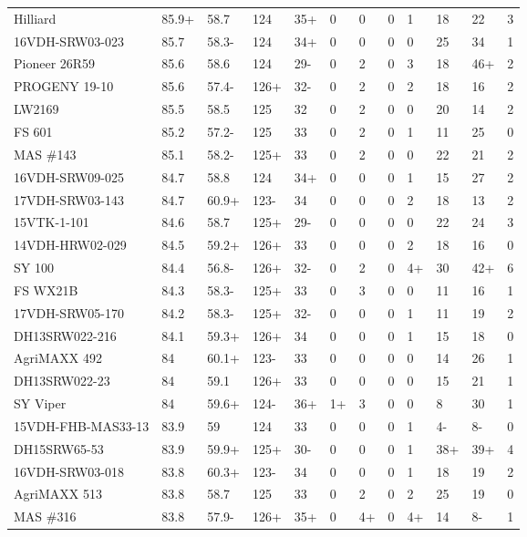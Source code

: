\documentclass[12pt, letterpaper]{article}
\begin{document}
\begin{landscape}
\begin{ThreePartTable}
\begin{longtable}{llllllllllll}
  Hilliard & 85.9+ & 58.7 & 124 & 35+ & 0 & 0 & 0 & 1 & 18 & 22 & 3 \\ 
  16VDH-SRW03-023 & 85.7 & 58.3- & 124 & 34+ & 0 & 0 & 0 & 0 & 25 & 34 & 1 \\ 
  Pioneer 26R59 & 85.6 & 58.6 & 124 & 29- & 0 & 2 & 0 & 3 & 18 & 46+ & 2 \\ 
  PROGENY 19-10 & 85.6 & 57.4- & 126+ & 32- & 0 & 2 & 0 & 2 & 18 & 16 & 2 \\ 
  LW2169 & 85.5 & 58.5 & 125 & 32 & 0 & 2 & 0 & 0 & 20 & 14 & 2 \\ 
  FS 601 & 85.2 & 57.2- & 125 & 33 & 0 & 2 & 0 & 1 & 11 & 25 & 0 \\ 
  MAS \#143 & 85.1 & 58.2- & 125+ & 33 & 0 & 2 & 0 & 0 & 22 & 21 & 2 \\ 
  16VDH-SRW09-025 & 84.7 & 58.8 & 124 & 34+ & 0 & 0 & 0 & 1 & 15 & 27 & 2 \\ 
  17VDH-SRW03-143 & 84.7 & 60.9+ & 123- & 34 & 0 & 0 & 0 & 2 & 18 & 13 & 2 \\ 
  15VTK-1-101 & 84.6 & 58.7 & 125+ & 29- & 0 & 0 & 0 & 0 & 22 & 24 & 3 \\ 
  14VDH-HRW02-029 & 84.5 & 59.2+ & 126+ & 33 & 0 & 0 & 0 & 2 & 18 & 16 & 0 \\ 
  SY 100 & 84.4 & 56.8- & 126+ & 32- & 0 & 2 & 0 & 4+ & 30 & 42+ & 6 \\ 
  FS WX21B & 84.3 & 58.3- & 125+ & 33 & 0 & 3 & 0 & 0 & 11 & 16 & 1 \\ 
  17VDH-SRW05-170 & 84.2 & 58.3- & 125+ & 32- & 0 & 0 & 0 & 1 & 11 & 19 & 2 \\ 
  DH13SRW022-216 & 84.1 & 59.3+ & 126+ & 34 & 0 & 0 & 0 & 1 & 15 & 18 & 0 \\ 
  AgriMAXX 492 & 84 & 60.1+ & 123- & 33 & 0 & 0 & 0 & 0 & 14 & 26 & 1 \\ 
  DH13SRW022-23 & 84 & 59.1 & 126+ & 33 & 0 & 0 & 0 & 0 & 15 & 21 & 1 \\ 
  SY Viper & 84 & 59.6+ & 124- & 36+ & 1+ & 3 & 0 & 0 & 8 & 30 & 1 \\ 
  15VDH-FHB-MAS33-13 & 83.9 & 59 & 124 & 33 & 0 & 0 & 0 & 1 & 4- & 8- & 0 \\ 
  DH15SRW65-53 & 83.9 & 59.9+ & 125+ & 30- & 0 & 0 & 0 & 1 & 38+ & 39+ & 4 \\ 
  16VDH-SRW03-018 & 83.8 & 60.3+ & 123- & 34 & 0 & 0 & 0 & 1 & 18 & 19 & 2 \\ 
  AgriMAXX 513 & 83.8 & 58.7 & 125 & 33 & 0 & 2 & 0 & 2 & 25 & 19 & 0 \\ 
  MAS \#316 & 83.8 & 57.9- & 126+ & 35+ & 0 & 4+ & 0 & 4+ & 14 & 8- & 1 \\ 

\end{longtable}
\end{ThreePartTable}
\end{landscape}
\end{document}

